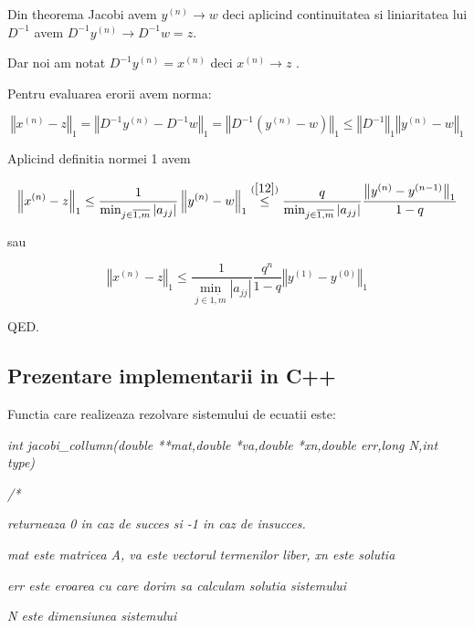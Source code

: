 \documentclass[a4paper,twoside]{book}
\begin{document}
Din theorema Jacobi avem $y^{(n)}\rightarrow w$ deci aplicind continuitatea
si liniaritatea lui $D^{-1}$ avem $D^{-1}y^{(n)}\rightarrow D^{-1}w=z$.

Dar noi am notat $D^{-1}y^{(n)}=x^{(n)}$ deci $x^{(n)}\rightarrow z$ .

Pentru evaluarea erorii avem norma:

\begin{equation*}
\left\Vert x^{(n)}-z\right\Vert _{1}=\left\Vert
D^{-1}y^{(n)}-D^{-1}w\right\Vert _{1}=\left\Vert
D^{-1}(y^{(n)}-w)\right\Vert _{1}\leq \left\Vert D^{-1}\right\Vert
_{1}\left\Vert y^{(n)}-w\right\Vert _{1}
\end{equation*}

Aplicind definitia normei 1 avem

\begin{equation*}
\left\Vert x^{(n)}-z\right\Vert _{1}\leq \frac{1}{\min_{j\in \overline{1,m}%
}\left\vert a_{jj}\right\vert }\left\Vert y^{(n)}-w\right\Vert _{1}\overset{(%
\ref{12})}{\leq }\frac{q}{\min_{j\in \overline{1,m}}\left\vert
a_{jj}\right\vert }\frac{\left\Vert y^{(n)}-y^{(n-1)}\right\Vert _{1}}{1-q}
\end{equation*}

sau

\begin{equation*}
\left\Vert x^{(n)}-z\right\Vert _{1}\leq \frac{1}{\min_{j\in \overline{1,m}%
}\left\vert a_{jj}\right\vert }\frac{q^{n}}{1-q}\left\Vert
y^{(1)}-y^{(0)}\right\Vert _{1}
\end{equation*}

QED.

\subsection{Prezentare implementarii in C++}

\bigskip Functia care realizeaza rezolvare sistemului de ecuatii este:

\textit{int jacobi\_collumn(double **mat,double *va,double *xn,double
err,long N,int type)}

\textit{/*}

\textit{\qquad returneaza 0 in caz de succes si -1 in caz de insucces.}

\textit{\qquad mat este matricea A, va este vectorul termenilor liber, xn
este solutia}

\textit{\qquad err este eroarea cu care dorim sa calculam solutia sistemului}

\textit{\qquad N este dimensiunea sistemului}
\end{document}
